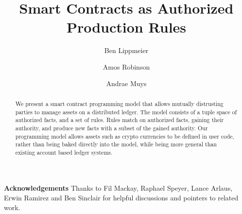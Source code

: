 \documentclass[format=sigconf, review=true, screen=true]{acmart}
\begin{document}

\title
{       Smart Contracts as Authorized Production Rules}



\author{Ben Lippmeier}

\author{Amos Robinson}

\author{Andrae Muys}

\begin{abstract}
We present a smart contract programming model that allows mutually distrusting parties to manage assets on a distributed ledger. The model consists of a tuple space of authorized facts, and a set of rules. Rules match on authorized facts, gaining their authority, and produce new facts with a subset of the gained authority. Our programming model allows assets such as crypto currencies to be defined in user code, rather than being baked directly into the model, while being more general than existing account based ledger systems.
\end{abstract}

\maketitle
\makeatactive










\textbf{Acknowledgements}
Thanks to Fil Mackay, Raphael Speyer, Lance Arlaus, Erwin Ramirez and Ben Sinclair for helpful discussions and pointers to related work.




\clearpage{}


\end{document}
